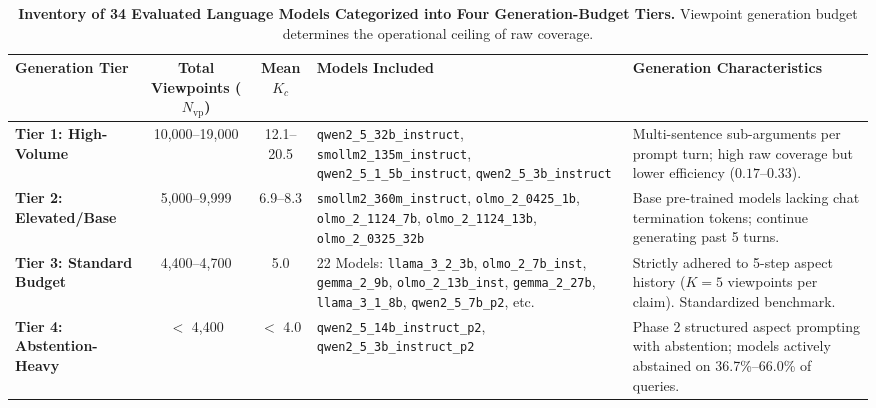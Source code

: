 \documentclass[11pt,a4paper]{article}
\begin{document}
\begin{table}[htbp]
\centering
\small
\caption{\textbf{Inventory of 34 Evaluated Language Models Categorized into Four Generation-Budget Tiers.} Viewpoint generation budget determines the operational ceiling of raw coverage.}
\label{tab:generation_tiers}
\begin{adjustbox}{max width=\textwidth}
\begin{tabular}{l c c p{5.5cm} p{7.2cm}}
\toprule
\textbf{Generation Tier} & \makecell{\textbf{Total Viewpoints}\\\textbf{($N_{\text{vp}}$)}} & \makecell{\textbf{Mean}\\\textbf{$K_c$}} & \textbf{Models Included} & \textbf{Generation Characteristics} \\
\midrule
\textbf{Tier 1: High-Volume} & 10,000--19,000 & 12.1--20.5 & \texttt{qwen2\_5\_32b\_instruct}, \texttt{smollm2\_135m\_instruct}, \texttt{qwen2\_5\_1\_5b\_instruct}, \texttt{qwen2\_5\_3b\_instruct} & Multi-sentence sub-arguments per prompt turn; high raw coverage but lower efficiency ($0.17$--$0.33$). \\
\addlinespace
\textbf{Tier 2: Elevated/Base} & 5,000--9,999 & 6.9--8.3 & \texttt{smollm2\_360m\_instruct}, \texttt{olmo\_2\_0425\_1b}, \texttt{olmo\_2\_1124\_7b}, \texttt{olmo\_2\_1124\_13b}, \texttt{olmo\_2\_0325\_32b} & Base pre-trained models lacking chat termination tokens; continue generating past 5 turns. \\
\addlinespace
\textbf{Tier 3: Standard Budget} & 4,400--4,700 & 5.0 & 22 Models: \texttt{llama\_3\_2\_3b}, \texttt{olmo\_2\_7b\_inst}, \texttt{gemma\_2\_9b}, \texttt{olmo\_2\_13b\_inst}, \texttt{gemma\_2\_27b}, \texttt{llama\_3\_1\_8b}, \texttt{qwen2\_5\_7b\_p2}, etc. & Strictly adhered to 5-step aspect history ($K = 5$ viewpoints per claim). Standardized benchmark. \\
\addlinespace
\textbf{Tier 4: Abstention-Heavy} & $<$ 4,400 & $<$ 4.0 & \texttt{qwen2\_5\_14b\_instruct\_p2}, \texttt{qwen2\_5\_3b\_instruct\_p2} & Phase 2 structured aspect prompting with abstention; models actively abstained on 36.7\%--66.0\% of queries. \\
\bottomrule
\end{tabular}
\end{adjustbox}
\end{table}
\end{document}
